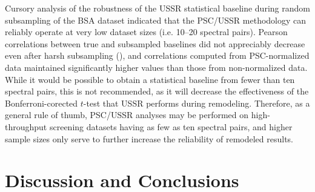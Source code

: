 \begin{doublespace}
Cursory analysis of the robustness of the USSR statistical
baseline during random subsampling of the BSA dataset indicated that the
PSC/USSR methodology can reliably operate at very low dataset sizes
(i.e. 10--20 spectral pairs). Pearson correlations between true and subsampled
baselines did not appreciably decrease even after harsh subsampling
(), and correlations computed from PSC-normalized
data maintained significantly higher values than those from non-normalized
data. While it would be possible to obtain a statistical baseline from fewer
than ten spectral pairs, this is not recommended, as it will decrease the
effectiveness of the Bonferroni-corected $t$-test that USSR performs during
remodeling. Therefore, as a general rule of thumb, PSC/USSR analyses may be
performed on high-throughput screening datasets having as few as ten spectral
pairs, and higher sample sizes only serve to further increase the reliability
of remodeled results.
\end{doublespace}

\section{Discussion and Conclusions}

